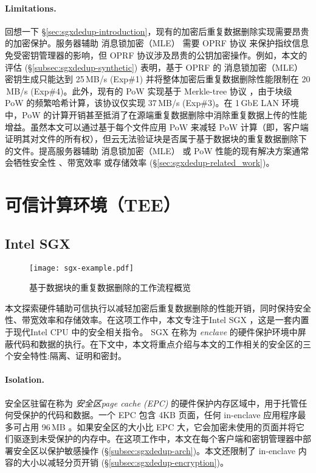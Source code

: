 \paragraph*{Limitations.} 回想一下 \S\ref{sec:sgxdedup-introduction}，现有的加密后重复数据删除实现需要昂贵的加密保护。服务器辅助 消息锁加密（MLE） 需要 OPRF 协议 \cite{naor2004Number} 来保护指纹信息免受密钥管理器的影响，但 OPRF 协议涉及昂贵的公钥加密操作。例如，本文的评估 (\S\ref{subsec:sgxdedup-synthetic}) 表明，基于 OPRF 的 消息锁加密（MLE） 密钥生成只能达到 25\,MB/s (Exp\#1) 并将整体加密后重复数据删除性能限制在 20 \,MB/s (Exp\#4)。此外，现有的 PoW 实现基于 Merkle-tree 协议 \cite{halevi11}，由于块级 PoW 的频繁哈希计算，该协议仅实现 37\,MB/s (Exp\#3)。在 1\,GbE LAN 环境中，PoW 的计算开销甚至抵消了在源端重复数据删除中消除重复数据上传的性能增益。虽然本文可以通过基于每个文件应用 PoW 来减轻 PoW 计算（即，客户端证明其对文件的所有权），但云无法验证块是否属于基于数据块的重复数据删除下的文件。提高服务器辅助 消息锁加密（MLE） 或 PoW 性能的现有解决方案通常会牺牲安全性 \cite{li20b,xu2013weak,pietro12}、带宽效率 \cite{harnik10,li15} 或存储效率 \cite{zhou2015secdep,qin17,li20b} (\S\ref{sec:sgxdedup-related_work})。


\section{可信计算环境（TEE）}
\label{sec:background-tee}

\subsection{Intel SGX}
\label{subsec:background-tee-sgx}

\begin{figure}[!htb]
    \small
    \centering
    \texttt{[image: sgx-example.pdf]}
    \caption{基于数据块的重复数据删除的工作流程概览} 
    \label{fig:重复数据删除的工作流程概览}
\end{figure}


本文探索硬件辅助可信执行以减轻加密后重复数据删除的性能开销，同时保持安全性、带宽效率和存储效率。在这项工作中，本文专注于Intel SGX \cite{sgx}，这是一套内置于现代Intel CPU 中的安全相关指令。 SGX 在称为 \textit{ enclave} 的硬件保护环境中屏蔽代码和数据的执行。在下文中，本文将重点介绍与本文的工作相关的安全区的三个安全特性:隔离、证明和密封。

\paragraph*{Isolation.}安全区驻留在称为 \textit{安全区page cache (EPC)} 的硬件保护内存区域中，用于托管任何受保护的代码和数据。一个 EPC 包含 4KB 页面，任何 in-enclave 应用程序最多可占用 96\,MB \cite{harnik18}。如果安全区的大小比 EPC 大，它会加密未使用的页面并将它们驱逐到未受保护的内存中。在这项工作中，本文在每个客户端和密钥管理器中部署安全区以保护敏感操作 (\S\ref{subsec:sgxdedup-arch})。本文还限制了 in-enclave 内容的大小以减轻分页开销 (\S\ref{subsec:sgxdedup-encryption})。

